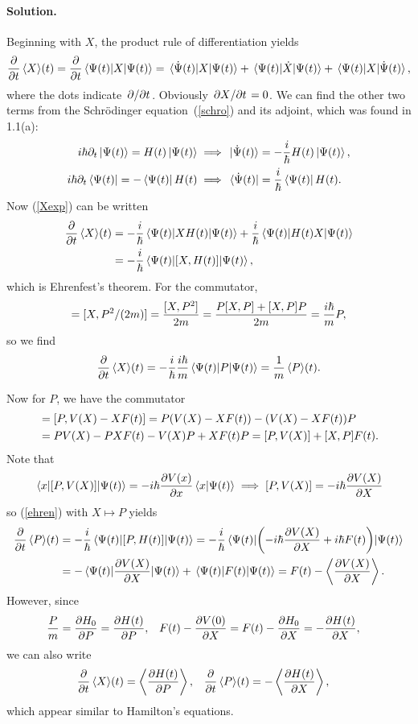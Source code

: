 \documentclass[11pt]{article}
\newcommand{\refeq}[1]{(\ref{#1})}
\newenvironment{solution}
{
    \paragraph{Solution.}
    \ignorespaces
}
{
}
\newcommand{\Schrodinger}{Schr\"{o}dinger}
\begin{document}
\begin{solution}
	Beginning with $X$, the product rule of differentiation yields
	\begin{equation} \label{Xexp}
		\pdv{}{t} \evXt = \pdv{}{t} \ev{X}{\Psi(t)} = \mel*{\dot{\Psi}(t)}{X}{\Psi(t)} + \ev*{\dot{X}}{\Psi(t)} + \mel*{\Psi(t)}{X}{\dot{\Psi}(t)},
	\end{equation}
	where the dots indicate $\pdv*{}{t}$.  Obviously $\pdv*{X}{t} = 0$.  We can find the other two terms from the {\Schrodinger} equation~\refeq{schro} and its adjoint, which was found in 1.1(a):
	\begin{align}
		i \hbar \partial_t \ket{\Psi(t)} = H(t) \ket{\Psi(t)} &\implies \ket*{\dot{\Psi}(t)} = -\frac{i}{\hbar} H(t) \ket{\Psi(t)}, \\
		i \hbar \partial_t \bra{\Psi(t)} = -\bra{\Psi(t)} H(t) &\implies \bra*{\dot{\Psi}(t)} = \frac{i}{\hbar} \bra{\Psi(t)} H(t).
	\end{align}
	Now \refeq{Xexp} can be written
	\begin{align}
		\pdv{}{t} \evXt &= -\frac{i}{\hbar} \mel{\Psi(t)}{X \Ht}{\Psi(t)} + \frac{i}{\hbar} \mel{\Psi(t)}{\Ht X}{\Psi(t)} \\
		&= -\frac{i}{\hbar} \ev{[X, \Ht]}{\Psi(t)}, \label{ehren}
	\end{align}
	which is Ehrenfest's theorem.  For the commutator,
	\begin{equation}
		[X, \Ht] = [X, P^2/(2m)] = \frac{[X, P^2]}{2m} = \frac{P [X, P] + [X, P] P}{2m} = \frac{\ihb}{m} P,
	\end{equation}
	so we find
	\begin{equation}
		\pdv{}{t} \evXt = -\frac{i}{\hbar} \frac{\ihb}{m} \ev{P}{\Psi(t)} = \frac{1}{m} \evPt.
	\end{equation}
	
	Now for $P$, we have the commutator
	\begin{align}
		[P, \Ht] &= [P, \VX - X \Ft] = P (\VX - X \Ft) - (\VX - X \Ft) P \\
		&= P \VX - P X \Ft - \VX P + X \Ft P = [P, \VX] + [X, P] \Ft.
	\end{align}
	Note that
	\begin{equation}
		\mel{x}{[P, V(X)]}{\Psi(t)} = -i \hbar \pdv{V(x)}{x} \braket{x}{\Psi(t)} \implies [P, V(X)] = -i \hbar \pdv{V(X)}{X}
	\end{equation}
	so \refeq{ehren} with $X \mapsto P$ yields
	\begin{align}
		\pdv{}{t} \evPt &= -\frac{i}{\hbar} \ev{[P, \Ht]}{\Psi(t)} = -\frac{i}{\hbar} \ev{\left( -\ihb \pdv{V(X)}{X} + \ihb \Ft \right)}{\Psi(t)} \\
		&= -\ev{\pdv{V(X)}{X}}{\Psi(t)} + \ev{F(t)}{\Psi(t)} = F(t) - \ev{\pdv{V(X)}{X}}.
	\end{align}
	However, since
	\begin{align}
		\frac{P}{m} &= \pdv{H_0}{P} = \pdv{H(t)}{P}, &
		F(t) - \pdv{V(0)}{X} &= F(t) - \pdv{H_0}{X} = -\pdv{H(t)}{X},
	\end{align}
	we can also write
	\begin{align} \label{hameq}
		\pdv{}{t} \evXt &= \ev{\pdv{\Ht}{P}}, &
		\pdv{}{t} \evPt &= -\ev{\pdv{\Ht}{X}},
	\end{align}
	which appear similar to Hamilton's equations.
	

\end{solution}
\end{document}

